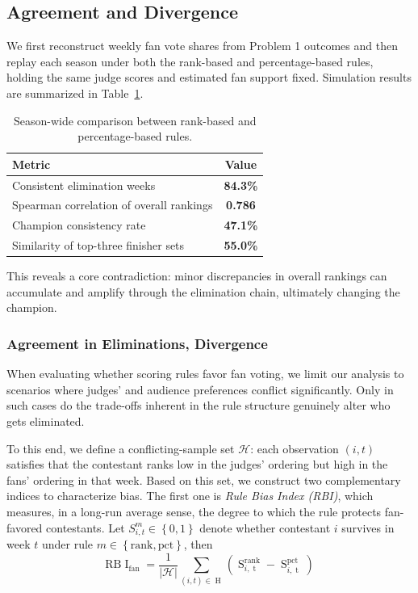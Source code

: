 \documentclass[12pt]{article}
\begin{document}
\subsection{Agreement and Divergence}
We first reconstruct weekly fan vote shares from Problem 1 outcomes and then replay each season under both the rank-based and percentage-based rules, holding the same judge scores and estimated fan support fixed. Simulation results are summarized in Table~\ref{tab:rank-vs-pct-summary}.

\begin{table}[H]
  \centering
  \caption{Season-wide comparison between rank-based and percentage-based rules.}
  \label{tab:rank-vs-pct-summary}
  \begin{tabular}{l c}
    \toprule
    Metric & Value \\
    \midrule
    Consistent elimination weeks & \textbf{84.3\%} \\
    Spearman correlation of overall rankings & \textbf{0.786} \\
    Champion consistency rate & \textbf{47.1\%} \\
    Similarity of top-three finisher sets & \textbf{55.0\%} \\
    \bottomrule
  \end{tabular}
\end{table}

This reveals a core contradiction: minor discrepancies in overall rankings can accumulate and amplify through the elimination chain, ultimately changing the champion.

\subsubsection{Agreement in Eliminations, Divergence}

When evaluating whether scoring rules favor fan voting, we limit our analysis to scenarios where judges' and audience preferences conflict significantly. Only in such cases do the trade-offs inherent in the rule structure genuinely alter who gets eliminated.

To this end, we define a conflicting-sample set $\mathcal{H}$: each observation $(i,t)$ satisfies that the contestant ranks low in the judges' ordering but high in the fans' ordering in that week. Based on this set, we construct two complementary indices to characterize bias. The first one is \textit{Rule Bias Index (RBI)}, which measures, in a long-run average sense, the degree to which the rule protects fan-favored contestants. Let $S_{i,t}^m\in\left\{0,1\right\}$ denote whether contestant $i$ survives in week $t$ under rule $m\in\left\{\mathrm{rank},\mathrm{pct}\right\}$, then
\begin{equation}
  \mathrm{RB}\mathrm{\operatorname{I}}_{\mathrm{fan}}=\frac{1}{\left|\mathcal{H}\right|}\sum_{\left(i,t\right)\in\operatorname{H}}\left(\operatorname{S}_{i,\operatorname{t}}^{\mathrm{rank}}-\operatorname{S}_{i,\operatorname{t}}^{\mathrm{pct}}\right)
\end{equation}
\end{document}
